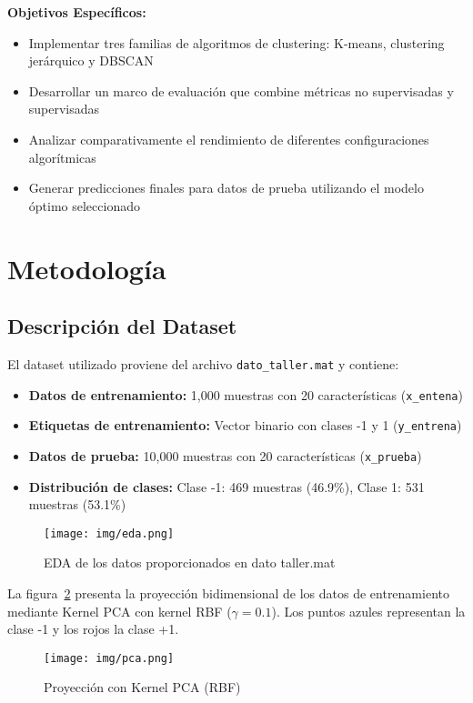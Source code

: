 \documentclass[12pt,a4paper]{article}
\begin{document}
\textbf{Objetivos Específicos:}
\begin{itemize}
    \item Implementar tres familias de algoritmos de clustering: K-means, clustering jerárquico y DBSCAN
    \item Desarrollar un marco de evaluación que combine métricas no supervisadas y supervisadas
    \item Analizar comparativamente el rendimiento de diferentes configuraciones algorítmicas
    \item Generar predicciones finales para datos de prueba utilizando el modelo óptimo seleccionado
\end{itemize}

\section{Metodología}

\subsection{Descripción del Dataset}

El dataset utilizado proviene del archivo \texttt{dato\_taller.mat} y contiene:
\begin{itemize}
    \item \textbf{Datos de entrenamiento:} 1,000 muestras con 20 características (\texttt{x\_entena})
    \item \textbf{Etiquetas de entrenamiento:} Vector binario con clases -1 y 1 (\texttt{y\_entrena})
    \item \textbf{Datos de prueba:} 10,000 muestras con 20 características (\texttt{x\_prueba})
    \item \textbf{Distribución de clases:} Clase -1: 469 muestras (46.9\%), Clase 1: 531 muestras (53.1\%)
\end{itemize}

\begin{figure}[H]
    \centering
    \texttt{[image: img/eda.png]}
    \caption{EDA de los datos proporcionados en dato taller.mat}
    \label{fig:eda}
\end{figure}

La figura~\ref{fig:pca} presenta la proyección bidimensional de los datos de entrenamiento mediante Kernel PCA con kernel RBF ($\gamma=0.1$). Los puntos azules representan la clase -1 y los rojos la clase +1. 

\begin{figure}[H]
    \centering
    \texttt{[image: img/pca.png]}
    \caption{Proyección con Kernel PCA (RBF)}
    \label{fig:pca}
\end{figure}
\end{document}
